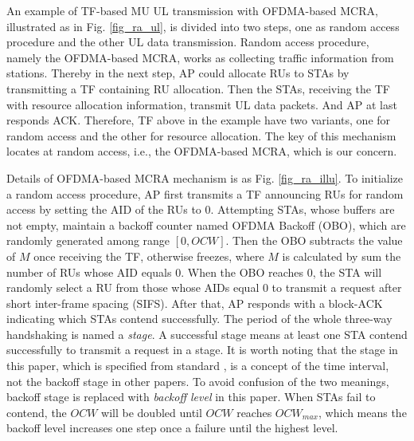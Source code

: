 \documentclass[journal]{IEEEtran}
\begin{document}
An example of TF-based MU UL transmission with OFDMA-based MCRA, illustrated as in Fig. \ref{fig_ra_ul}, is divided into two steps, one as random access procedure and the other UL data transmission.
Random access procedure, namely the OFDMA-based MCRA, works as collecting traffic information from stations.
Thereby in the next step, AP could allocate RUs to STAs by transmitting a TF containing RU allocation.
Then the STAs, receiving the TF with resource allocation information, transmit UL data packets. And AP at last responds ACK.
Therefore, TF above in the example have two variants, one for random access and the other for resource allocation. 
The key of this mechanism locates at random access, i.e., the OFDMA-based MCRA, which is our concern.


Details of OFDMA-based MCRA mechanism is as Fig. \ref{fig_ra_illu}. 
To initialize a random access procedure, AP first transmits a TF announcing RUs for random access by setting the AID of the RUs to 0. 
Attempting STAs, whose buffers are not empty, maintain a backoff counter named OFDMA Backoff (OBO), which are randomly generated among range $[0, OCW]$.
Then the OBO subtracts the value of $M$ once receiving the TF, otherwise freezes, where $M$ is calculated by sum the number of RUs whose AID equals 0.  
When the OBO reaches 0, the STA will randomly select a RU from those whose AIDs equal 0 to transmit a request after short inter-frame spacing (SIFS). 
After that, AP responds with a block-ACK indicating which STAs contend successfully. The period of the whole three-way handshaking is named a \textit{stage}.
A successful stage means at least one STA contend successfully to transmit a request in a stage. 
It is worth noting that the stage in this paper, which is specified from standard \cite{draft_ax}, is a concept of the time interval, not the backoff stage in other papers.
To avoid confusion of the two meanings, backoff stage is replaced with \textit{backoff level} in this paper.  
When STAs fail to contend, the $OCW$ will be doubled until $OCW$ reaches $OCW_{max}$, which means the backoff level increases one step once a failure until the highest level.
\end{document}
